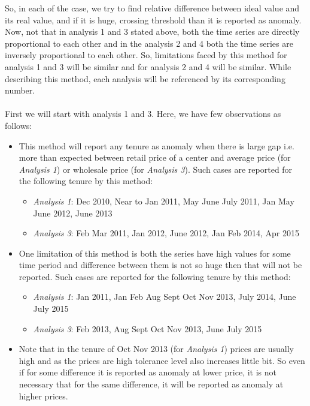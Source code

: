 \documentclass[a4paper,10pt]{report}
\begin{document}
		So, in each of the case, we try to find relative difference between ideal value and its real value, and if it is huge, crossing threshold than it is reported as anomaly. Now, not that in analysis 1 and 3 stated above, both the time series are directly proportional to each other and in the analysis 2 and 4 both the time series are inversely proportional to each other. So, limitations faced by this method for analysis 1 and 3 will be similar and for analysis 2 and 4 will be similar. While describing this method, each analysis will be referenced by its corresponding number.\\
		\\
		First we will start with analysis 1 and 3. Here, we have few observations as follows:
		
		\begin{itemize}
			\item This method will report any tenure as anomaly when there is large gap i.e. more than expected between retail price of a center and average price (for \textit{Analysis 1}) or wholesale price (for \textit{Analysis 3}).
			Such cases are reported for the following tenure by this method:
			\begin{itemize}
				\item \textit{Analysis 1}: Dec 2010, Near to Jan 2011, May June July 2011, Jan May June 2012, June 2013
				\item \textit{Analysis 3}: Feb Mar 2011, Jan 2012, June 2012, Jan Feb 2014, Apr 2015
			\end{itemize}
			
			
			\item One limitation of this method is both the series have high values for some time period and difference between them is not so huge then that will not be reported.	
			Such cases are reported for the following tenure by this method:
			\begin{itemize}
				\item \textit{Analysis 1}: Jan 2011, Jan Feb Aug Sept Oct Nov 2013, July 2014, June July 2015
				\item \textit{Analysis 3}: Feb 2013, Aug Sept Oct Nov 2013, June July 2015
			\end{itemize}		
			
			\item  Note that in the tenure of Oct Nov 2013 (for \textit{Analysis 1}) prices are usually high and as the prices are high tolerance level also increases little bit. So even if for some difference it is reported as anomaly at lower price, it is not necessary that for the same difference, it will be reported as anomaly at higher prices.			
			
		\end{itemize}
		
\end{document}
